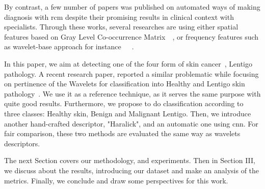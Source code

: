 By contrast, a few number of papers was published on automated ways of making diagnosis with \ac{rcm} despite their promising results in clinical context with specialists. Through these works, several researches are using either spatial features based on Gray Level Co-occurrence Matrix~\cite{Wiltgen2008}~\cite{Koller2011}, or frequency features such as wavelet-base approach for instance~\cite{Wiltgen2008}~\cite{Koller2011}~\cite{Halimi2017a}.\par 
In this paper, we aim at detecting one of the four form of skin cancer~\cite{LeGal2011}, \ie Lentigo pathology. A recent research paper, reported a similar problematic while focusing on pertinence of the Wavelets for classification into Healthy and Lentigo skin pathology~\cite{Halimi2017a}. We use it as a reference technique, as it serves the same purpose with quite good results. Furthermore, we propose to do classification according to three classes: Healthy skin, Benign and Malignant Lentigo. Then, we introduce another hand-crafted descriptor, "Haralick", and an automatic one using \ac{cnn}. For fair comparison, these two methods are evaluated the same way as wavelets descriptors.\par
The next Section covers our methodology, and experiments. Then in Section III, we discuss about the results, introducing our dataset and make an analysis of the metrics. Finally, we conclude and draw some perspectives for this work.\par